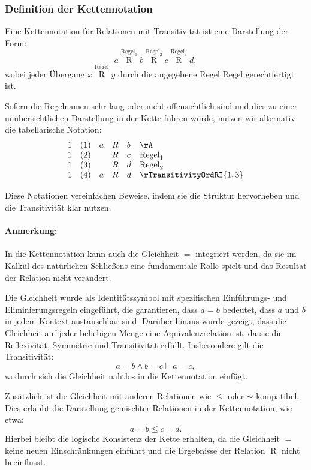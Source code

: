 \documentclass{book}
\theoremstyle{plain}
\theoremstyle{remark}
\theoremstyle{definition}
\begin{document}
\subsubsection*{Definition der Kettennotation}

Eine Kettennotation für Relationen mit Transitivität ist eine Darstellung der Form:
\[
a \stackrel{\text{Regel}_1}{\mathrel{R}} b \stackrel{\text{Regel}_2}{\mathrel{R}} c \stackrel{\text{Regel}_3}{\mathrel{R}} d,
\]
wobei jeder Übergang \(x \stackrel{\text{Regel}}{\mathrel{R}} y\) durch die angegebene Regel \(\text{Regel}\) gerechtfertigt ist.

Sofern die Regelnamen sehr lang oder nicht offensichtlich sind und dies zu einer unübersichtlichen Darstellung in der Kette führen würde, nutzen wir alternativ die tabellarische Notation:
\[
\begin{array}{llclll}
	1 & (1) & a & \mathrel{R} & b & \rA \\
	1 & (2) &   & \mathrel{R} & c & \text{Regel}_1 \\
	1 & (3) &   & \mathrel{R} & d & \text{Regel}_2 \\
        1 & (4) &  a & \mathrel{R} & d & \rTransitivityOrdRI{1,3} \\
\end{array}
\]

Diese Notationen vereinfachen Beweise, indem sie die Struktur hervorheben und die Transitivität klar nutzen.

\paragraph{Anmerkung:}  
In die Kettennotation kann auch die Gleichheit \(=\) integriert werden, da sie im Kalkül des natürlichen Schließens eine fundamentale Rolle spielt und das Resultat der Relation nicht verändert. 

Die Gleichheit wurde als Identitätssymbol mit spezifischen Einführungs- und Eliminierungsregeln eingeführt, die garantieren, dass \(a = b\) bedeutet, dass \(a\) und \(b\) in jedem Kontext austauschbar sind. Darüber hinaus wurde gezeigt, dass die Gleichheit auf jeder beliebigen Menge eine Äquivalenzrelation ist, da sie die Reflexivität, Symmetrie und Transitivität erfüllt. Insbesondere gilt die Transitivität:
\[
a = b \land b = c \vdash a = c,
\]
wodurch sich die Gleichheit nahtlos in die Kettennotation einfügt.

Zusätzlich ist die Gleichheit mit anderen Relationen wie \(\leq\) oder \(\sim\) kompatibel. Dies erlaubt die Darstellung gemischter Relationen in der Kettennotation, wie etwa:
\[
a = b \leq c = d.
\]
Hierbei bleibt die logische Konsistenz der Kette erhalten, da die Gleichheit \(=\) keine neuen Einschränkungen einführt und die Ergebnisse der Relation \(\mathrel{R}\) nicht beeinflusst.
\end{document}
